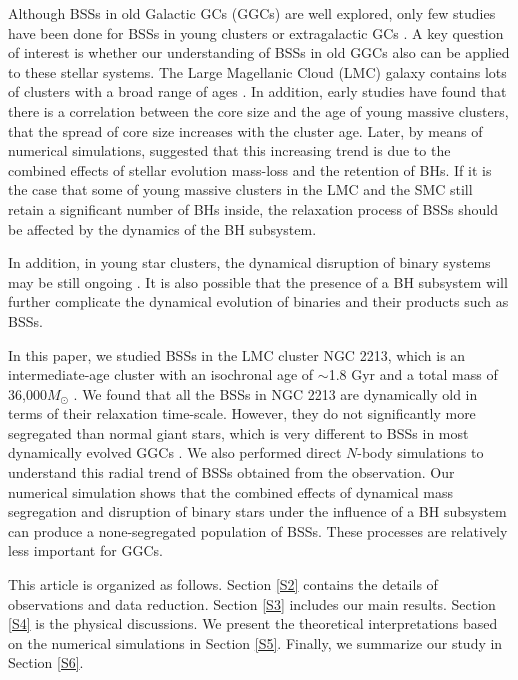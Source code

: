 \documentclass[useAMS,usenatbib,twocolumn]{mnras}
\begin{document}
Although BSSs in old Galactic GCs (GGCs) are well explored, only few studies have been done for BSSs in young clusters \citep[e.g.,][]{Xin07a} or extragalactic GCs \citep[e.g.,][]{Li13a}. A key question of interest is whether our understanding of BSSs in old GGCs also can be applied to these stellar systems. The Large Magellanic Cloud (LMC) galaxy contains lots of clusters with a broad range of ages \citep[e.g.,][]{Mcla05a,Baum13a}. In addition, early studies \citep[e.g.,][]{1989ApJ...347L..69E,1991ApJS...76..185E,1992MNRAS.256..515E,2003MNRAS.338...85M} have found that there is a correlation between the core size and the age of young massive clusters, that the spread of core size increases with the cluster age. Later, by means of numerical simulations, \citet{2008MNRAS.386...65M} suggested that this increasing trend is due to the combined effects of stellar evolution mass-loss and the retention of BHs. If it is the case that some of young massive clusters in the LMC and the SMC still retain a significant number of BHs inside, the relaxation process of BSSs should be affected by the dynamics of the BH subsystem. 

In addition, in young star clusters, the dynamical disruption of binary systems  may be still ongoing \citep[e.g.,][]{Li13b,Gell13a}. It is also possible that the presence of a BH subsystem will further complicate the dynamical evolution of binaries and their products such as BSSs.

In this paper, we studied BSSs in the LMC cluster NGC 2213, which is an intermediate-age cluster with an isochronal age of $\sim$1.8 Gyr and a total mass of 36,000$M_{\odot}$ \citep{Baum13a}. We found that all the BSSs in NGC 2213 are dynamically old in terms of their relaxation time-scale. However, they do not significantly more segregated than normal giant stars, which is very different to BSSs in most dynamically evolved GGCs \citep[e.g.,][]{Ferr12a}. We also performed direct $N$-body simulations to understand this radial trend of BSSs obtained from the observation. Our numerical simulation shows that the combined effects of dynamical mass segregation and disruption of binary stars under the influence of a BH subsystem can produce a none-segregated population of BSSs. These processes are relatively less important for GGCs.

This article is organized as follows. Section \ref{S2} contains the details of observations and data reduction. Section \ref{S3} includes our main results. Section \ref{S4} is the physical discussions. We present the theoretical interpretations based on the numerical simulations in Section \ref{S5}. Finally, we summarize our study in Section \ref{S6}.
\end{document}
